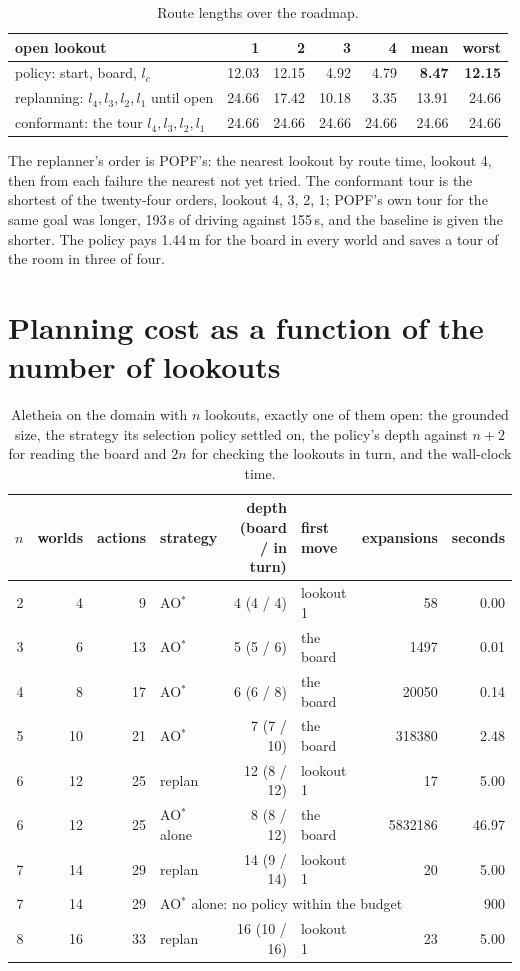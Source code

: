 \documentclass[11pt,a4paper]{article}
\theoremstyle{definition}
\begin{document}
\begin{table}[H]
\centering
\small
\begin{tabular}{@{}lrrrrrr@{}}
\toprule
open lookout & 1 & 2 & 3 & 4 & mean & worst \\
\midrule
policy: start, board, $l_c$ & 12.03 & 12.15 & 4.92 & 4.79 & \textbf{8.47} & \textbf{12.15} \\
replanning: $l_4, l_3, l_2, l_1$ until open & 24.66 & 17.42 & 10.18 & 3.35 & 13.91 & 24.66 \\
conformant: the tour $l_4, l_3, l_2, l_1$ & 24.66 & 24.66 & 24.66 & 24.66 & 24.66 & 24.66 \\
\bottomrule
\end{tabular}
\caption{Route lengths over the roadmap.}
\end{table}

\noindent
The replanner's order is POPF's: the nearest lookout by route time, lookout 4,
then from each failure the nearest not yet tried. The conformant tour is the
shortest of the twenty-four orders, lookout 4, 3, 2, 1; POPF's own tour for the
same goal was longer, 193\,s of driving against 155\,s, and the baseline is
given the shorter. The policy pays 1.44\,m for the board in every world and
saves a tour of the room in three of four.

\section{Planning cost as a function of the number of lookouts}

\begin{table}[H]
\centering
\small
\begin{tabular}{@{}rrrlrlrr@{}}
\toprule
$n$ & worlds & actions & strategy & depth (board / in turn) & first move & expansions & seconds \\
\midrule
2 & 4 & 9 & AO$^*$ & 4 (4 / 4) & lookout 1 & 58 & 0.00 \\
3 & 6 & 13 & AO$^*$ & 5 (5 / 6) & the board & 1497 & 0.01 \\
4 & 8 & 17 & AO$^*$ & 6 (6 / 8) & the board & 20050 & 0.14 \\
5 & 10 & 21 & AO$^*$ & 7 (7 / 10) & the board & 318380 & 2.48 \\
6 & 12 & 25 & replan & 12 (8 / 12) & lookout 1 & 17 & 5.00 \\
6 & 12 & 25 & AO$^*$ alone & 8 (8 / 12) & the board & 5832186 & 46.97 \\
7 & 14 & 29 & replan & 14 (9 / 14) & lookout 1 & 20 & 5.00 \\
7 & 14 & 29 & \multicolumn{4}{l}{AO$^*$ alone: no policy within the budget} & 900 \\
8 & 16 & 33 & replan & 16 (10 / 16) & lookout 1 & 23 & 5.00 \\
\bottomrule
\end{tabular}
\caption{Aletheia on the domain with $n$ lookouts, exactly one of them open:
the grounded size, the strategy its selection policy settled on, the
policy's depth against $n+2$ for reading the board and $2n$ for checking the
lookouts in turn, and the wall-clock time.}
\end{table}
\end{document}
